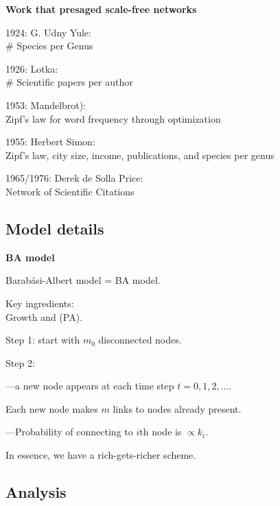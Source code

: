 \begin{frame}[label=]
\begin{frame}[label=]
\begin{frame}[label=]
  \textbf{Work that presaged scale-free networks}
    
     
      1924: \alert{G. Udny Yule}\cite{yule1924a}:\\ \# Species per Genus
     
      1926: \alert{Lotka}\cite{lotka1926a}:\\ \# Scientific papers per author
      
      1953: \alert{Mandelbrot}\cite{mandelbrot1953a}):\\
      Zipf's law for word frequency through optimization
     
      1955: \alert{Herbert Simon}\cite{simon1955a,zipf1949a}:\\ Zipf's law, 
      city size, income, publications, and species per genus
     
      1965/1976: \alert{Derek de Solla Price}\cite{price1965a,price1976a}:\\ Network of Scientific Citations
    
  


\subsection{Model details}

\begin{frame}[label=]
 \textbf{BA model}  
 
 
  
   Barab\'{a}si-Albert model = BA model.
  
   Key ingredients:\\
   \alert{Growth} and  (PA).
  
   \alert{Step 1}: start with $m_0$ disconnected nodes.
  
   \alert{Step 2}: 
   
     
     ---a new node appears at each time step $t=0,1,2, \ldots$.
    
     Each new node makes $m$ links to nodes already present.
    
     ---Probability 
     of connecting to $i$th node is $\propto k_i$.
   
 
   In essence, we have a \alert{rich-gets-richer} scheme.
 


\subsection{Analysis}


\end{frame}
\end{frame}
\end{frame}
\end{frame}
